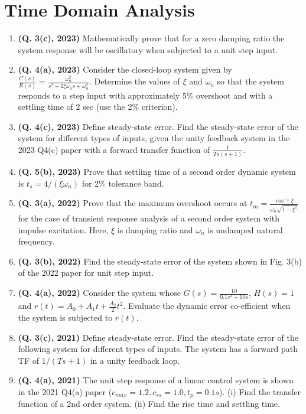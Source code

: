 \documentclass[12pt, a4paper]{article}
\begin{document}
	\section{Time Domain Analysis}
	\begin{enumerate}
		\item \textbf{(Q. 3(c), 2023)} Mathematically prove that for a zero damping ratio the system response will be oscillatory when subjected to a unit step input.
		\item \textbf{(Q. 4(a), 2023)} Consider the closed-loop system given by $\frac{C(s)}{R(s)} = \frac{\omega_n^2}{s^2 + 2\xi\omega_n s + \omega_n^2}$. Determine the values of $\xi$ and $\omega_n$ so that the system responds to a step input with approximately 5\% overshoot and with a settling time of 2 sec (use the 2\% criterion).
		\item \textbf{(Q. 4(c), 2023)} Define steady-state error. Find the steady-state error of the system for different types of inputs, given the unity feedback system in the 2023 Q4(c) paper with a forward transfer function of $\frac{1}{Ts(s+1)}$.
		\item \textbf{(Q. 5(b), 2023)} Prove that settling time of a second order dynamic system is $t_s = 4/(\xi\omega_n)$ for 2\% tolerance band.
		\item \textbf{(Q. 3(a), 2022)} Prove that the maximum overshoot occurs at $t_m = \frac{\cos^{-1}\xi}{\omega_n\sqrt{1-\xi^2}}$ for the case of transient response analysis of a second order system with impulse excitation. Here, $\xi$ is damping ratio and $\omega_n$ is undamped natural frequency.
		\item \textbf{(Q. 3(b), 2022)} Find the steady-state error of the system shown in Fig. 3(b) of the 2022 paper for unit step input.
		\item \textbf{(Q. 4(a), 2022)} Consider the system whose $G(s) = \frac{10}{0.1s^2+10s}$, $H(s) = 1$ and $r(t) = A_0 + A_1t + \frac{A_2}{2}t^2$. Evaluate the dynamic error co-efficient when the system is subjected to $r(t)$.
		\item \textbf{(Q. 3(c), 2021)} Define steady-state error. Find the steady-state error of the following system for different types of inputs. The system has a forward path TF of $1/(Ts+1)$ in a unity feedback loop.
		\item \textbf{(Q. 4(a), 2021)} The unit step response of a linear control system is shown in the 2021 Q4(a) paper ($c_{max}=1.2, c_{ss}=1.0, t_p=0.1s$). (i) Find the transfer function of a 2nd order system. (ii) Find the rise time and settling time.

\end{enumerate}
\end{document}

